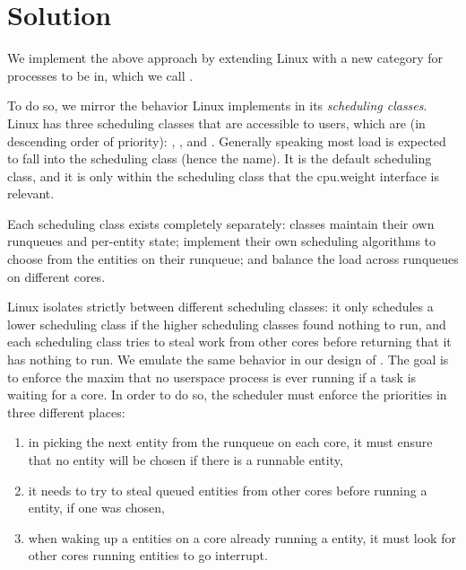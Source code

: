 \section{Solution}\label{s:solution}

We implement the above approach by extending Linux with a new category for
processes to be in, which we call \beclass{}.

To do so, we mirror the behavior Linux implements in its \textit{scheduling
classes}. Linux has three scheduling classes that are accessible to users, which
are (in descending order of priority): \deadlineclass{}, \fifoclass{}, and
\normalclass{}. Generally speaking most load is expected to fall into the
\normalclass{} scheduling class (hence the name). It is the default scheduling
class, and it is only within the \normalclass{} scheduling class that the
\cgroups{} cpu.weight interface is relevant.

Each scheduling class exists completely separately: classes maintain their own
runqueues and per-entity state; implement their own scheduling algorithms to
choose from the entities on their runqueue; and balance the load across
runqueues on different cores.

Linux isolates strictly between different scheduling classes: it only schedules
a lower scheduling class if the higher scheduling classes found nothing to run,
and each scheduling class tries to steal work from other cores before returning
that it has nothing to run. We emulate the same behavior in our design of
\beclass{}. The goal is to enforce the maxim that no \beclass{} userspace process
is ever running if a \normalclass{} task is waiting for a core. In order to do
so, the scheduler must enforce the priorities in three different places:
\begin{enumerate}
    \item in picking the next entity from the runqueue on each core, it must
ensure that no \beclass{} entity will be chosen if there is a runnable
\normalclass{} entity,
    \item it needs to try to steal queued \normalclass{} entities from other cores
before running a \beclass{} entity, if one was chosen,
    \item when waking up a \normalclass{} entities on a core already running a
    \normalclass{} entity, it must look for other cores running \beclass{}
    entities to go interrupt.
\end{enumerate}

